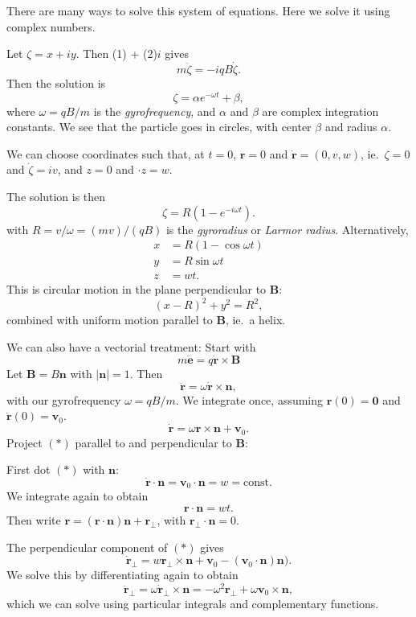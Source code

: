 \documentclass[a4paper]{article}
\begin{document}
There are many ways to solve this system of equations. Here we solve it using complex numbers.

Let $\zeta = x + iy$. Then (1) + (2)$i$ gives
\[
  m\ddot{\zeta} = -iqB\dot{\zeta}.
\]
Then the solution is
\[
  \zeta = \alpha e^{-\omega t} + \beta,
\]
where $\omega = qB/m$ is the \emph{gyrofrequency}, and $\alpha$ and $\beta$ are complex integration constants. We see that the particle goes in circles, with center $\beta$ and radius $\alpha$.

We can choose coordinates such that, at $t = 0$, $\mathbf{r} = 0$ and $\dot{\mathbf{r}} = (0, v, w)$, ie.~$\zeta = 0$ and $\dot{\zeta} = iv$, and $z = 0$ and $\cdot z = w$.

The solution is then
\[
  \zeta = R(1 - e^{-i\omega t}).
\]
with $R = v/\omega = (mv)/(qB)$ is the \emph{gyroradius} or \emph{Larmor radius}. Alternatively,
\begin{align*}
  x &= R(1 - \cos \omega t)\\
  y &= R\sin \omega t\\
  z &= wt.
\end{align*}
This is circular motion in the plane perpendicular to $\mathbf{B}$:
\[
  (x - R)^2 + y^2 = R^2,
\]
combined with uniform motion parallel to $\mathbf{B}$, ie.~a helix.

We can also have a vectorial treatment: Start with
\[
  m\ddot{\mathbf{e}} = q\dot{\mathbf{r}}\times \mathbf{B}
\]
Let $\mathbf{B} = B\mathbf{n}$ with $|\mathbf{n}| = 1$. Then
\[
  \ddot{\mathbf{r}} = \omega \dot{\mathbf{r}}\times \mathbf{n},
\]
with our gyrofrequency $\omega = qB/m$. We integrate once, assuming $\mathbf{r}(0) = \mathbf{0}$ and $\dot{\mathbf{r}}(0) = \mathbf{v}_0$.
\[
  \dot{\mathbf{r}} = \omega \mathbf{r} \times \mathbf{n} + \mathbf{v}_0. \tag{$*$}
\]
Project $(*)$ parallel to and perpendicular to $\mathbf{B}$:

First dot $(*)$ with $\mathbf{n}$:
\[
  \dot{\mathbf{r}}\cdot \mathbf{n} = \mathbf{v}_0\cdot \mathbf{n} = w = \text{const}.
\]
We integrate again to obtain
\[
  \mathbf{r}\cdot \mathbf{n} = wt.
\]
Then write $\mathbf{r} = (\mathbf{r}\cdot \mathbf{n})\mathbf{n} + \mathbf{r}_\bot$, with $\mathbf{r}_\bot \cdot \mathbf{n} = 0$.

The perpendicular component of $(*)$ gives
\[
  \dot{\mathbf{r}}_\bot = w\mathbf{r}_\bot \times \mathbf{n} + \mathbf{v}_0 - (\mathbf{v}_0\cdot \mathbf{n})\mathbf{n}).
\]
We solve this by differentiating again to obtain
\[
  \ddot{\mathbf{r}}_\bot = \omega \dot{\mathbf{r}}_\bot \times \mathbf{n} = -\omega^2 \mathbf{r}_\bot + \omega \mathbf{v}_0 \times \mathbf{n},
\]
which we can solve using particular integrals and complementary functions.
\end{document}
